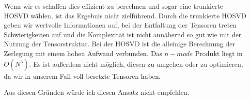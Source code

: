 Wenn wir es schaffen dies effizient zu berechnen und sogar eine trunkierte HOSVD wählen, ist das Ergebnis nicht zielführend. Durch die trunkierte HOSVD geben wir wertvolle Informationen auf, bei der Entfaltung der Tensoren treten Schwierigkeiten auf und die Komplexität ist nicht annähernd so gut wie mit der Nutzung der Tensorstruktur.
Bei der HOSVD ist die alleinige Berechnung der Zerlegung mit einem hohen Aufwand verbunden. Das $n-mode$ Produkt liegt in $O(N^5)$. Es ist außerdem nicht möglich, diesen zu umgehen oder zu optimieren, da wir in unserem Fall voll besetzte Tensoren haben. 

Aus diesen Gründen würde ich diesen Ansatz nicht empfehlen.

